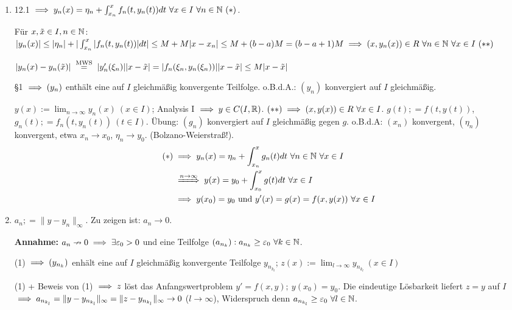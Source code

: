 \documentclass{article}
\begin{document}
\begin{beweis}
\begin{enumerate}
\item 12.1 $\folgt y_n(x) = \eta_n + \int_{x_n}^{x} f_n(t,y_n(t))dt \ \forall x\in I\ \forall n\in\MdN\ (*)$.

Für $x,\tilde x \in I, n\in\mathbb{N}$: $|y_n(x)|\le |\eta_n| + |\int_{x_n}^x|f_n(t,y_n(t))|dt|\le M + M|x-x_n| \le M + (b-a)M = (b-a+1)M \folgt (x,y_n(x) )\in R \ \forall n\in\MdN\ \forall x\in I \ (**)$

$|y_n(x) - y_n(\tilde x)| \gleichnach{MWS} |y_n'(\xi_n)||x-\tilde x| = |f_n(\xi_n, y_n(\xi_n))||x-\tilde x| \le M|x-\tilde x|$

§1 $\implies (y_n)$ enthält eine auf $I$ gleichmäßig konvergente Teilfolge. o.B.d.A.: $(y_n)$ konvergiert auf $I$ gleichmäßig.

$y(x) := \lim_{n\to\infty} y_n(x)\ (x\in I)$; Analysis I $\implies y\in C(I,\mathbb{R})$. $(**) \implies (x,y(x))\in R \ \forall x\in I$. $g(t) ;= f(t,y(t))$, $g_n(t) ;= f_n(t,y_n(t))\ (t\in I)$. Übung: $(g_n)$ konvergiert auf $I$ gleichmäßig gegen $g$. o.B.d.A: $(x_n)$ konvergent, $(\eta_n)$ konvergent, etwa $x_n\to x_0$, $\eta_n \to y_0$. (Bolzano-Weierstraß!).
\begin{align*}
(*) &\folgt y_n(x) = \eta_n + \int_{x_n}^x g_n(t)dt\ \forall n\in\MdN \ \forall x\in I\\
&\folgtwegen{n\to\infty} y(x) = y_0 + \int_{x_0}^x g(t)dt \ \forall x\in I\\
&\folgt y(x_0) = y_0 \text{ und } y'(x) = g(x) = f(x,y(x)) \ \forall x\in I
\end{align*}
\item $a_n ;= \|y-y_n\|_\infty$. Zu zeigen ist: $a_n\to0$.

\textbf{Annahme:} $a_n\nrightarrow 0 \implies \exists \varepsilon_0 >0$ und eine Teilfolge $(a_{n_k}): a_{n_k} \ge \varepsilon_0 \ \forall k\in\mathbb{N}$.

(1) $\implies (y_{n_k})$ enhält eine auf $I$ gleichmäßig konvergente Teilfolge $y_{n_{k_l}}$; $z(x) := \lim_{l\to\infty}y_{n_{k_l}}\ (x\in I)$

(1) + Beweis von (1) $\implies z$ löst das Anfangswertproblem $y'=f(x,y);\ y(x_0) = y_0$. Die eindeutige Lösbarkeit liefert $z=y$ auf $I$ $\implies a_{n_{k_l}} = \| y - y_{n_{k_l}}\|_\infty = \|z - y_{n_{k_l}}\|_\infty \to 0$ ($l\to\infty$), Widerspruch denn $a_{n_{k_l}}\ge \ep_0 \ \forall l\in\MdN$.
\end{enumerate}
\end{beweis}
\end{document}
